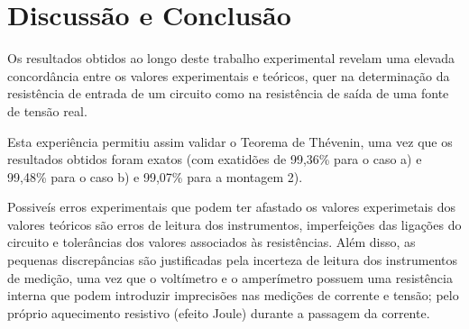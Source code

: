 \section{Discussão e Conclusão}

Os resultados obtidos ao longo deste trabalho experimental revelam uma elevada concordância entre os valores experimentais e teóricos, quer na determinação da resistência de entrada de um circuito como na resistência de saída de uma fonte de tensão real.

Esta experiência permitiu assim validar o Teorema de Thévenin, uma vez que os resultados obtidos foram exatos (com exatidões de 99,36\% para o caso a) e 99,48\% para o caso b) e 99,07\% para a montagem 2).

Possiveís erros experimentais que podem ter afastado os valores experimetais dos valores teóricos são erros de leitura dos instrumentos, imperfeições das ligações do circuito e tolerâncias dos valores associados às resistências. Além disso, as pequenas discrepâncias são justificadas pela incerteza de leitura dos instrumentos de medição, uma vez que o voltímetro e o amperímetro possuem uma resistência interna que podem introduzir imprecisões nas medições de corrente e tensão; pelo próprio aquecimento resistivo (efeito Joule) durante a passagem da corrente.